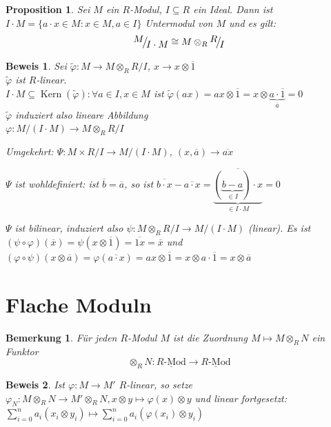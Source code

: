 \documentclass[a4paper,12pt]{scrbook}
\theoremstyle{break}
\newtheorem{Bem}[Def]{Bemerkung}
\newtheorem{Prop}[Def]{Proposition}
\theoremstyle{nonumberbreak}
\newtheorem{Bew}{Beweis}
\theoremstyle{nonumberplain}
\DeclareMathOperator{\Kern}{Kern}
\newcommand{\FakRaum}[2]{
  \raisebox{0.7ex}{\ensuremath{#1}}
  \ensuremath{\mkern-3mu}\big/\ensuremath{\mkern-3mu}
  \raisebox{-0.6ex}{\ensuremath{#2}}}
\begin{document}
\begin{Prop}
  Sei $M$ ein $R$-Modul, $I \subseteq R$ ein Ideal. Dann ist $I \cdot M = 
  \{ a \cdot x \in M: x \in M, a \in I \}$ Untermodul von $M$ und es gilt: \\
  $$\FakRaum{M}{I \cdot M} \cong M \otimes_R \FakRaum{R}{I}$$
\end{Prop}

\begin{Bew}
  Sei $\tilde{\varphi}: M \rightarrow M \otimes_R R/I$, 
  $ x \rightarrow x \otimes \overline{1}$\\
  $\tilde{\varphi}$  ist $R$-linear.\\
  $I \cdot M \subseteq \Kern(\tilde{\varphi}): \forall a \in I, x \in M$ ist
  $\tilde{\varphi}(ax) = ax \otimes \overline 1 = x \otimes \underbrace{ a \cdot \overline{1} }_{\overline a} = 0$\\
  $\tilde{\varphi}$ induziert also lineare Abbildung\\
  $\varphi: M/({I \cdot M}) \rightarrow M \otimes_R R/I$

  Umgekehrt: $\Psi: M \times R/I \rightarrow M /({I \cdot M})$, $(x, \overline a) \rightarrow \overline{ax}$

  $\Psi$ ist wohldefiniert: ist $\overline b = \overline a$, so ist $\overline{b \cdot x} - \overline{a \cdot x} =
  \overline{ \underbrace {( \underbrace{b-a}_{\in I}) \cdot x}_{ \in I \cdot M}} =0$

  $\Psi$ ist bilinear, induziert also $\psi: M \otimes_R R/I \rightarrow M/({I \cdot M})$ (linear). Es ist 
  $(\psi \circ \varphi)(\overline x )= \psi(x \otimes \overline 1 ) = \overline{1x} = \overline x$ und
  $(\varphi \circ \psi)(x \otimes \overline a ) = \varphi(\overline{a \cdot x }) = ax \otimes \overline 1 =
  x \otimes a\cdot \overline 1 = x \otimes \overline a$
\end{Bew}
\section{Flache Moduln}

\begin{Bem}
  Für jeden $R$-Modul $M$ ist die Zuordnung $M \mapsto M \otimes_R N$ ein Funktor
  \[\otimes_R N: \underline{R\mbox{-Mod}} \to \underline{R\mbox{-Mod}}\]
\end{Bem}

\begin{Bew} 
  Ist $\varphi: M \to M'$ $R$-linear, so setze $\varphi_N: M \otimes_R N \to M'
  \otimes_R N, x \otimes y \mapsto \varphi(x) \otimes y$ und linear fortgesetzt: $\displaystyle
  \sum_{i=0}^n a_i(x_i \otimes y_i) \mapsto \sum_{i=0}^n a_i(\varphi(x_i) \otimes y_i)$
\end{Bew}
\end{document}
